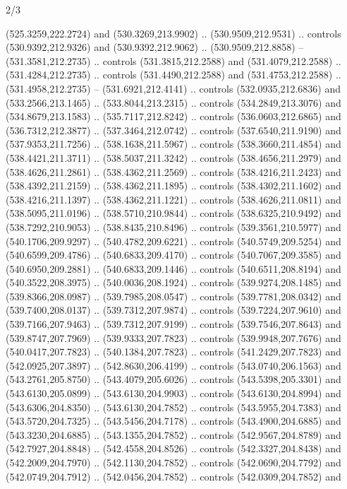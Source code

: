 \begin{flagdescription}{2/3}
\begin{scope}[xshift=0.5\flaglength,yshift=0.5\flagwidth,scale=\flagwidth/495.65]
\begin{scope}[y=0.8pt, x=0.8pt, yscale=-1,shift={(-463.76,-309.78)}]
  (525.3259,222.2724) and (530.3269,213.9902) .. (530.9509,212.9531) .. controls
  (530.9392,212.9326) and (530.9392,212.9062) .. (530.9509,212.8858) --
  (531.3581,212.2735) .. controls (531.3815,212.2588) and (531.4079,212.2588) ..
  (531.4284,212.2735) .. controls (531.4490,212.2588) and (531.4753,212.2588) ..
  (531.4958,212.2735) -- (531.6921,212.4141) .. controls (532.0935,212.6836) and
  (533.2566,213.1465) .. (533.8044,213.2315) .. controls (534.2849,213.3076) and
  (534.8679,213.1583) .. (535.7117,212.8242) .. controls (536.0603,212.6865) and
  (536.7312,212.3877) .. (537.3464,212.0742) .. controls (537.6540,211.9190) and
  (537.9353,211.7256) .. (538.1638,211.5967) .. controls (538.3660,211.4854) and
  (538.4421,211.3711) .. (538.5037,211.3242) .. controls (538.4656,211.2979) and
  (538.4626,211.2861) .. (538.4362,211.2569) .. controls (538.4216,211.2423) and
  (538.4392,211.2159) .. (538.4362,211.1895) .. controls (538.4302,211.1602) and
  (538.4216,211.1397) .. (538.4362,211.1221) .. controls (538.4626,211.0811) and
  (538.5095,211.0196) .. (538.5710,210.9844) .. controls (538.6325,210.9492) and
  (538.7292,210.9053) .. (538.8435,210.8496) .. controls (539.3561,210.5977) and
  (540.1706,209.9297) .. (540.4782,209.6221) .. controls (540.5749,209.5254) and
  (540.6599,209.4786) .. (540.6833,209.4170) .. controls (540.7067,209.3585) and
  (540.6950,209.2881) .. (540.6833,209.1446) .. controls (540.6511,208.8194) and
  (540.3522,208.3975) .. (540.0036,208.1924) .. controls (539.9274,208.1485) and
  (539.8366,208.0987) .. (539.7985,208.0547) .. controls (539.7781,208.0342) and
  (539.7400,208.0137) .. (539.7312,207.9874) .. controls (539.7224,207.9610) and
  (539.7166,207.9463) .. (539.7312,207.9199) .. controls (539.7546,207.8643) and
  (539.8747,207.7969) .. (539.9333,207.7823) .. controls (539.9948,207.7676) and
  (540.0417,207.7823) .. (540.1384,207.7823) .. controls (541.2429,207.7823) and
  (542.0925,207.3897) .. (542.8630,206.4199) .. controls (543.0740,206.1563) and
  (543.2761,205.8750) .. (543.4079,205.6026) .. controls (543.5398,205.3301) and
  (543.6130,205.0899) .. (543.6130,204.9903) .. controls (543.6130,204.8994) and
  (543.6306,204.8350) .. (543.6130,204.7852) .. controls (543.5955,204.7383) and
  (543.5720,204.7325) .. (543.5456,204.7178) .. controls (543.4900,204.6885) and
  (543.3230,204.6885) .. (543.1355,204.7852) .. controls (542.9567,204.8789) and
  (542.7927,204.8848) .. (542.4558,204.8526) .. controls (542.3327,204.8438) and
  (542.2009,204.7970) .. (542.1130,204.7852) .. controls (542.0690,204.7792) and
  (542.0749,204.7912) .. (542.0456,204.7852) .. controls (542.0309,204.7852) and

\end{scope}
\end{scope}
\end{flagdescription}
